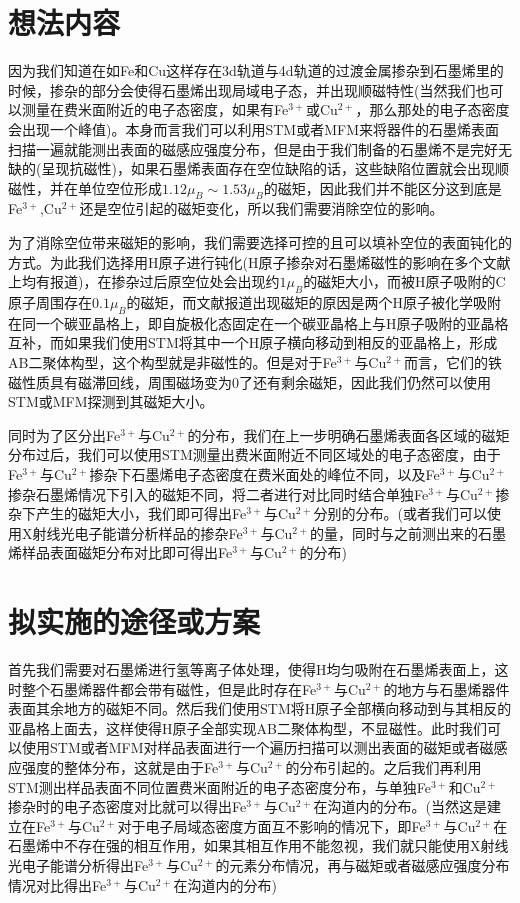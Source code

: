 \documentclass{phyasgn}\usepackage{nag}
\begin{document}
\section{想法内容}
\par 因为我们知道在如Fe和Cu这样存在3d轨道与4d轨道的过渡金属掺杂到石墨烯里的时候，掺杂的部分会使得石墨烯出现局域电子态，并出现顺磁特性(当然我们也可以测量在费米面附近的电子态密度，如果有Fe$^{3+}$或Cu$^{2+}$，那么那处的电子态密度会出现一个峰值)\cite{sadki2019spontaneous}。本身而言我们可以利用STM或者MFM来将器件的石墨烯表面扫描一遍就能测出表面的磁感应强度分布，但是由于我们制备的石墨烯不是完好无缺的(呈现抗磁性)，如果石墨烯表面存在空位缺陷的话，这些缺陷位置就会出现顺磁性，并在单位空位形成$1.12\mu_{B}\sim 1.53\mu_{B}$的磁矩\cite{haffad2018effect,septya2021electronic}，因此我们并不能区分这到底是Fe$^{3+}$,Cu$^{2+}$还是空位引起的磁矩变化，所以我们需要消除空位的影响。
\par 为了消除空位带来磁矩的影响，我们需要选择可控的且可以填补空位的表面钝化的方式。为此我们选择用H原子进行钝化(H原子掺杂对石墨烯磁性的影响在多个文献上均有报道\cite{gonzalez2016atomic,haffad2018effect,ray2018electronic})，在掺杂过后原空位处会出现约$1\mu_{B}$的磁矩大小，而被H原子吸附的C原子周围存在$0.1\mu_{B}$的磁矩\cite{septya2021electronic}，而文献报道出现磁矩的原因是两个H原子被化学吸附在同一个碳亚晶格上，即自旋极化态固定在一个碳亚晶格上与H原子吸附的亚晶格互补，而如果我们使用STM将其中一个H原子横向移动到相反的亚晶格上，形成AB二聚体构型，这个构型就是非磁性的\cite{gonzalez2016atomic}。但是对于Fe$^{3+}$与Cu$^{2+}$而言，它们的铁磁性质具有磁滞回线，周围磁场变为0了还有剩余磁矩，因此我们仍然可以使用STM或MFM探测到其磁矩大小。
\par 同时为了区分出Fe$^{3+}$与Cu$^{2+}$的分布，我们在上一步明确石墨烯表面各区域的磁矩分布过后，我们可以使用STM测量出费米面附近不同区域处的电子态密度，由于Fe$^{3+}$与Cu$^{2+}$掺杂下石墨烯电子态密度在费米面处的峰位不同\cite{sadki2019spontaneous}，以及Fe$^{3+}$与Cu$^{2+}$掺杂石墨烯情况下引入的磁矩不同，将二者进行对比同时结合单独Fe$^{3+}$与Cu$^{2+}$掺杂下产生的磁矩大小，我们即可得出Fe$^{3+}$与Cu$^{2+}$分别的分布。(或者我们可以使用X射线光电子能谱分析样品的掺杂Fe$^{3+}$与Cu$^{2+}$的量，同时与之前测出来的石墨烯样品表面磁矩分布对比即可得出Fe$^{3+}$与Cu$^{2+}$的分布)
\section{拟实施的途径或方案}
\par 首先我们需要对石墨烯进行氢等离子体处理，使得H均匀吸附在石墨烯表面上，这时整个石墨烯器件都会带有磁性，但是此时存在Fe$^{3+}$与Cu$^{2+}$的地方与石墨烯器件表面其余地方的磁矩不同。然后我们使用STM将H原子全部横向移动到与其相反的亚晶格上面去，这样使得H原子全部实现AB二聚体构型，不显磁性。此时我们可以使用STM或者MFM对样品表面进行一个遍历扫描可以测出表面的磁矩或者磁感应强度的整体分布，这就是由于Fe$^{3+}$与Cu$^{2+}$的分布引起的。之后我们再利用STM测出样品表面不同位置费米面附近的电子态密度分布，与单独Fe$^{3+}$和Cu$^{2+}$掺杂时的电子态密度对比就可以得出Fe$^{3+}$与Cu$^{2+}$在沟道内的分布。(当然这是建立在Fe$^{3+}$与Cu$^{2+}$对于电子局域态密度方面互不影响的情况下，即Fe$^{3+}$与Cu$^{2+}$在石墨烯中不存在强的相互作用，如果其相互作用不能忽视，我们就只能使用X射线光电子能谱分析得出Fe$^{3+}$与Cu$^{2+}$的元素分布情况，再与磁矩或者磁感应强度分布情况对比得出Fe$^{3+}$与Cu$^{2+}$在沟道内的分布)
\end{document}
